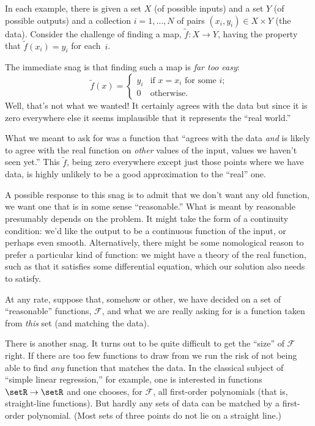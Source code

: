\documentclass[11pt, a4paper]{article}
\begin{document}
In each example, there is given a set $X$ (of possible inputs) and a
set $Y$ (of possible outputs) and a collection $i=1,\dots,N$ of pairs
$(x_i, y_i)\in X\times Y$ (the data). Consider the challenge of finding a
map, $\tilde{f}\colon X\to Y$, having the property that $\tilde{f}(x_i)=
y_i$ for each~$i$.

The immediate snag is that finding such a map is \emph{far too easy}:
\begin{equation*}
  \tilde{f}(x) =
  \begin{cases}
    y_i & \text{if $x = x_i$ for some $i$;} \\
      0 & \text{otherwise}.
  \end{cases}
\end{equation*}
Well, that's not what we wanted! It certainly agrees with the data but
since it is zero everywhere else it seems implausible that it
represents the “real world.”

What we meant to ask for was a function that “agrees with the data
\emph{and} is likely to agree with the real function on \emph{other}
values of the input, values we haven't seen yet.” This $\tilde{f}$,
being zero everywhere except just those points where we have data, is
highly unlikely to be a good approximation to the “real” one.

A possible response to this snag is to admit that we don't want any
old function, we want one that is in some sense “reasonable.” What is
meant by reasonable presumably depends on the problem. It might take
the form of a continuity condition: we'd like the output to be a
continuous function of the input, or perhaps even
smooth. Alternatively, there might be some nomological reason to
prefer a particular kind of function: we might have a theory of the
real function, such as that it satisfies some differential equation,
which our solution also needs to satisfy.

At any rate, suppose that, somehow or other, we have decided on a set
of “reasonable” functions, $\mathcal{F}$, and what we are really asking for is a
function taken from \emph{this} set (and matching the data).

There is another snag. It turns out to be quite difficult to get the
“size” of $\mathcal{F}$ right. If there are too few functions to draw from we
run the risk of not being able to find \emph{any} function that
matches the data. In the classical subject of “simple linear
regression,” for example, one is interested in functions $\setR \to
\setR$ and one chooses, for $\mathcal{F}$, all first-order polynomials (that is,
straight-line functions). But hardly any sets of data can be matched
by a first-order polynomial. (Most sets of three points do not lie on
a straight line.)
\end{document}
